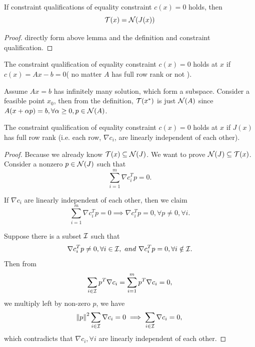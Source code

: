 \begin{refsection}
\begin{lemma}
If constraint qualifications of equality constraint $c(x) = 0$ holds, then
$$\mathcal{T}(x) = \mathcal{N}(J(x))$$
\end{lemma}
\begin{proof}
directly form above lemma and the definition and constraint qualification.
\end{proof}
 
\begin{lemma}
	The constraint qualification of equality constraint $c(x) = 0$ holds at $x$ if $c(x) = Ax - b = 0$( no matter $A$ has full row rank or not ).
\end{lemma}
\begin{remark}
Assume $Ax = b$ has infinitely many solution, which form a subspace. Consider a feasible point $x_0$, then from the definition, $\mathcal{T}(x^*)$ is just $\mathcal{N}(A)$ since $A(x + \alpha p) = b, \forall \alpha \geq 0, p\in \mathcal{N}(A)$.
\end{remark}


\begin{lemma}\cite[324]{nocedal2006numerical}
The constraint qualification of equality constraint $c(x) = 0$ holds at $x$ if $J(x)$ has full row rank (i.e. each row, $\nabla c_i$, are linearly independent of each other). 
\end{lemma}

\iffalse
\begin{proof}
Because we already know $\mathcal{T}(x) \subseteq \mathcal{N}(J)$. We want to prove $\mathcal{N}(J) \subseteq \mathcal{T}(x)$. Consider a nonzero $p \in \mathcal{N}(J)$ such that $$\sum_{i=1}^m \nabla c_i^T  p = 0.$$




If $\nabla c_i$ are linearly independent of each other, then we claim
$$\sum_{i=1}^m \nabla c_i^T p = 0 \implies \nabla c_i^T p = 0, \forall p\neq 0, \forall i.$$

Suppose there is a subset $\mathcal{I}$ such that $$\nabla c_i^T p \neq 0,\forall i\in \mathcal{I}, ~and~ \nabla c_i^T p = 0,\forall i\notin \mathcal{I}.$$
Then from $$\sum_{i\in \mathcal{I}} p^T\nabla c_i = \sum_{i = 1}^m p^T\nabla c_i = 0,$$
we multiply left by non-zero $p$, we have
$$\norm{p}^2 \sum_{i\in \mathcal{I}} \nabla c_i = 0 \implies \sum_{i\in \mathcal{I}} \nabla c_i = 0,$$
which contradicts that $\nabla c_i,\forall i$ are linearly independent of each other.
\end{proof}


\end{refsection}
